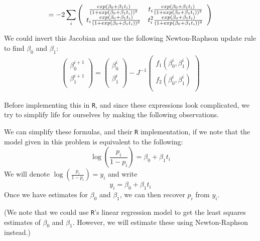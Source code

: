 \documentclass[12pt]{article}
\begin{document}
\begin{enumerate}[(a)]
 \begin{align*}
 = -2 \sum_i
\left( {\begin{array}{*{20}c}
\frac{exp(\beta_0 + \beta_1 t_i) } { (1 + exp(\beta_0 + \beta_1 t_i))^2 } & t_i \frac{exp(\beta_0 + \beta_1 t_i) } { (1 + exp(\beta_0 + \beta_1 t_i))^2 }\\
t_i \frac{exp(\beta_0 + \beta_1 t_i) } { (1 + exp(\beta_0 + \beta_1 t_i))^2 } & t_i^2 \frac{exp(\beta_0 + \beta_1 t_i) } { (1 + exp(\beta_0 + \beta_1 t_i))^2 }\\
 \end{array} } \right)
\end{align*}



We could invert this Jacobian and use the following Newton-Raphson update rule to find $\beta_0$ and $\beta_1$:
\begin{align*}
\left(
\begin{array}{c} 
   \beta_0^{i+1} \\
   \beta_1^{i+1}\\ 
\end{array}
\right)
=
\left(
\begin{array}{c} 
   \beta_0^{i} \\
   \beta_1^{i}\\ 
\end{array}
\right)
- J^{-1} 
\left(
\begin{array}{c} 
   f_1(\beta_0^{i}, \beta_1^{i} ) \\
   f_2(\beta_0^{i}, \beta_1^{i} ) \\
\end{array}
\right)
\end{align*} 

\bigskip
\bigskip
Before implementing this in \texttt{R}, and since these expressions look complicated, we try to simplify life for ourselves by making the following observations.

We can simplify these formulas, and their \texttt{R} implementation, if we note that
the model given in this problem is equivalent to the following:
$$
\log\left(\frac{p_i}{1 - p_i}\right) = \beta_0 + \beta_1 t_i
$$
We will denote $\log\left(\frac{p_i}{1 - p_i}\right) = y_i$ and write
$$
y_i = \beta_0 + \beta_1 t_i
$$
Once we have estimates for  $\beta_0$ and $\beta_1$, we can then recover $p_i$ from $y_i$.

(We note that we could use \texttt{R}'s linear regression model to get the least squares estimates of $\beta_0$ and $\beta_1$. However, we will estimate these using Newton-Raphson instead.)


\end{enumerate}
\end{document}
